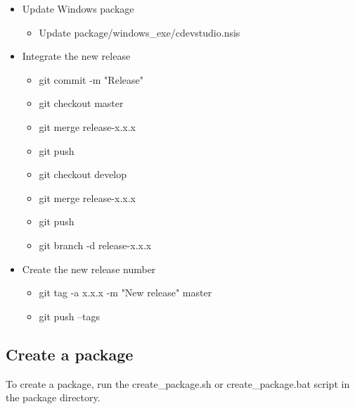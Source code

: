 \documentclass{article}
\begin{document}
\begin{itemize}
\begin{itemize}
	\end{itemize}
	\item Update Windows package
	\begin{itemize}
		\item Update package/windows_exe/cdevstudio.nsis
	\end{itemize}
	\item Integrate the new release
	\begin{itemize}
		\item git commit -m "Release"
		\item git checkout master
		\item git merge release-x.x.x
		\item git push
		\item git checkout develop
		\item git merge release-x.x.x
		\item git push
		\item git branch -d release-x.x.x
	\end{itemize}
	\item Create the new release number
	\begin{itemize}
		\item git tag -a x.x.x -m "New release" master
		\item git push --tags
	\end{itemize}
\end{itemize}

\subsection{Create a package}
To create a package, run the create_package.sh or create_package.bat script in the package directory.
\end{document}

